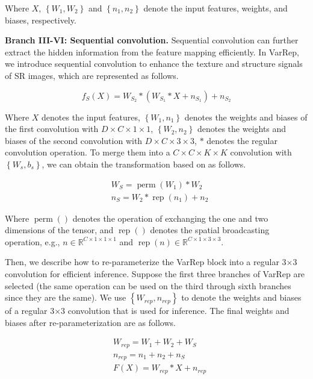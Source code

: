 \documentclass[sn-mathphys]{sn-jnl}%
\theoremstyle{thmstyleone}%
\theoremstyle{thmstyletwo}%
\theoremstyle{thmstylethree}%
\begin{document}
Where $X$, $\left\{W_1, W_2\right\}$ and $\left\{n_1, n_2\right\}$ denote the input features, weights, and biases, respectively.

\textbf{Branch III-VI: Sequential convolution.} Sequential convolution can further extract the hidden information from the feature mapping efficiently. In VarRep, we introduce sequential convolution to enhance the texture and structure signals of SR images, which are represented as follows.

\begin{equation}
f_S(X)=W_{S_2} *\left(W_{S_1} * X+n_{S_1}\right)+n_{S_2}
\end{equation}

Where $X$ denotes the input features, $\left\{W_1, n_1\right\}$ denotes the weights and biases of the first convolution with $D \times C \times 1 \times 1$, $\left\{W_2, n_2\right\}$ denotes the weights and biases of the second convolution with $D \times C \times 3 \times 3$, $*$ denotes the regular convolution operation. To merge them into a $C \times C \times K \times K$ convolution with $\left\{W_s, b_s\right\}$, we can obtain the transformation based on \cite{DBB} as follows.

\begin{equation}
\begin{aligned}
&W_S=\operatorname{perm}\left(W_1\right) * W_2 \\
&n_S=W_2 * \operatorname{rep}\left(n_1\right)+n_2
\end{aligned}
\end{equation}

Where $\operatorname{perm}()$ denotes the operation of exchanging the one and two dimensions of the tensor, and $\operatorname{rep}()$ denotes the spatial broadcasting operation, e.g., $n \in \mathbb{R}^{C \times 1 \times 1 \times 1}$ and $\operatorname{rep}(n) \in \mathbb{R}^{C \times 1 \times 3 \times 3}$.

Then, we describe how to re-parameterize the VarRep block into a regular 3$\times$3 convolution for efficient inference. Suppose the first three branches of VarRep are selected (the same operation can be used on the third through sixth branches since they are the same). We use $\left\{W_{rep}, n_{rep}\right\}$ to denote the weights and biases of a regular 3$\times$3 convolution that is used for inference. The final weights and biases after re-parameterization are as follows.

\begin{equation}
\begin{aligned}
&W_{r e p}=W_1+W_2+W_S \\
&n_{r e p}=n_1+n_2+n_S \\
&F(X)=W_{r e p} * X+n_{r e p}
\end{aligned}
\end{equation}
\end{document}
